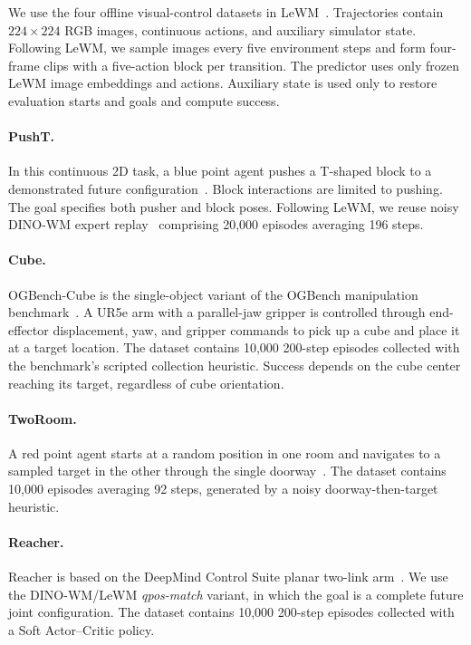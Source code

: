 We use the four offline visual-control datasets in LeWM~\citep{maes2026leworldmodel}. Trajectories contain $224\times224$ RGB images, continuous actions, and auxiliary simulator state. Following LeWM, we sample images every five environment steps and form four-frame clips with a five-action block per transition. The predictor uses only frozen LeWM image embeddings and actions. Auxiliary state is used only to restore evaluation starts and goals and compute success.

\paragraph{PushT.}
In this continuous 2D task, a blue point agent pushes a T-shaped block to a demonstrated future configuration~\citep{chi2025diffusion}. Block interactions are limited to pushing. The goal specifies both pusher and block poses. Following LeWM, we reuse noisy DINO-WM expert replay~\citep{zhou2025dinowm} comprising 20,000 episodes averaging 196 steps.

\paragraph{Cube.}
OGBench-Cube is the single-object variant of the OGBench manipulation
benchmark~\citep{park2025ogbench}.  A UR5e arm with a parallel-jaw gripper is
controlled through end-effector displacement, yaw, and gripper commands to
pick up a cube and place it at a target location.   The dataset contains 10,000 200-step
episodes collected with the benchmark's scripted collection heuristic.  Success depends on the cube center reaching its target, regardless of cube orientation.

\paragraph{TwoRoom.}
A red point agent starts at a random position in one room and navigates to a sampled target in the other through the single doorway~\citep{sobal2025stress}. The dataset contains 10,000 episodes averaging 92 steps, generated by a noisy doorway-then-target heuristic. 

\paragraph{Reacher.}
Reacher is based on the DeepMind Control Suite planar two-link
arm~\citep{tassa2018deepmind}.  We use the DINO-WM/LeWM \emph{qpos-match}
variant, in which the goal is a complete future joint configuration.   The dataset contains 10,000 200-step episodes collected with a
Soft Actor--Critic policy.




